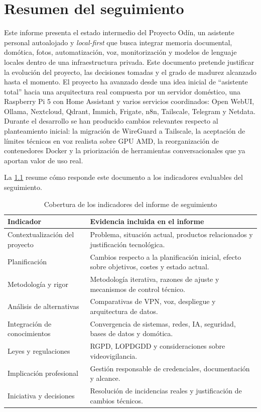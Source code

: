 \chapter{Resumen del seguimiento}

Este informe presenta el estado intermedio del Proyecto Odín, un asistente personal autoalojado y \textit{local-first} que busca integrar memoria documental, domótica, fotos, automatización, voz, monitorización y modelos de lenguaje locales dentro de una infraestructura privada. Este documento pretende justificar la evolución del proyecto, las decisiones tomadas y el grado de madurez alcanzado hasta el momento.
El proyecto ha avanzado desde una idea inicial de ``asistente total'' hacia una arquitectura real compuesta por un servidor doméstico, una Raspberry Pi 5 con Home Assistant y varios servicios coordinados: Open WebUI, Ollama, Nextcloud, Qdrant, Immich, Frigate, n8n, Tailscale, Telegram y Netdata. Durante el desarrollo se han producido cambios relevantes respecto al planteamiento inicial: la migración de WireGuard a Tailscale, la aceptación de límites técnicos en voz realista sobre GPU AMD, la reorganización de contenedores Docker y la priorización de herramientas conversacionales que ya aportan valor de uso real.

La \cref{tab:rubrica-seguimiento} resume cómo responde este documento a los indicadores evaluables del seguimiento.

\begin{table}[H]
  \centering
  \caption{Cobertura de los indicadores del informe de seguimiento}
  \label{tab:rubrica-seguimiento}
  \begin{tabularx}{\textwidth}{lX}
    \toprule
    Indicador & Evidencia incluida en el informe \\
    \midrule
    Contextualización del proyecto & Problema, situación actual, productos relacionados y justificación tecnológica. \\
    Planificación & Cambios respecto a la planificación inicial, efecto sobre objetivos, costes y estado actual. \\
    Metodología y rigor & Metodología iterativa, razones de ajuste y mecanismos de control técnico. \\
    Análisis de alternativas & Comparativas de VPN, voz, despliegue y arquitectura de datos. \\
    Integración de conocimientos & Convergencia de sistemas, redes, IA, seguridad, bases de datos y domótica. \\
    Leyes y regulaciones & RGPD, LOPDGDD y consideraciones sobre videovigilancia. \\
    Implicación profesional & Gestión responsable de credenciales, documentación y alcance. \\
    Iniciativa y decisiones & Resolución de incidencias reales y justificación de cambios técnicos. \\
    \bottomrule
  \end{tabularx}
\end{table}

